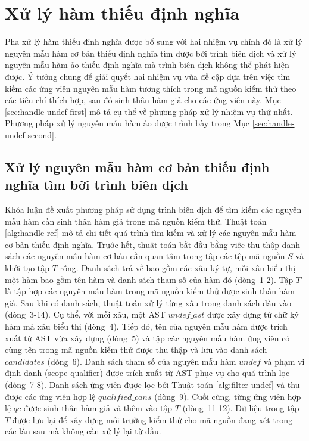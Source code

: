 \section{Xử lý hàm thiếu định nghĩa} \label{sec:handle-undef}
Pha xử lý hàm thiếu định nghĩa được bổ sung với hai nhiệm vụ chính đó là xử lý nguyên mẫu hàm cơ bản thiếu định nghĩa tìm được bởi trình biên dịch và xử lý nguyên mẫu hàm ảo thiếu định nghĩa mà trình biên dịch không thể phát hiện được. Ý tưởng chung để giải quyết hai nhiệm vụ vừa đề cập dựa trên việc tìm kiếm các ứng viên nguyên mẫu hàm tương thích trong mã nguồn kiểm thử theo các tiêu chí thích hợp, sau đó sinh thân hàm giả cho các ứng viên này. Mục \autoref{sec:handle-undef-first} mô tả cụ thể về phương pháp xử lý nhiệm vụ thứ nhất. Phương pháp xử lý nguyên mẫu hàm ảo được trình bày trong Mục \autoref{sec:handle-undef-second}.

\subsection{Xử lý nguyên mẫu hàm cơ bản thiếu định nghĩa tìm bởi trình biên dịch} \label{sec:handle-undef-first}
Khóa luận đề xuất phương pháp sử dụng trình biên dịch để tìm kiếm các nguyên mẫu hàm cần sinh thân hàm giả trong mã nguồn kiểm thử. Thuật toán \autoref{alg:handle-ref} mô tả chi tiết quá trình tìm kiếm và xử lý các nguyên mẫu hàm cơ bản thiếu định nghĩa. Trước hết, thuật toán bắt đầu bằng việc thu thập danh sách các nguyên mẫu hàm cơ bản cần quan tâm trong tập các tệp mã nguồn $S$ và khởi tạo tập $T$ rỗng. Danh sách trả về bao gồm các xâu ký tự, mỗi xâu biểu thị một hàm bao gồm tên hàm và danh sách tham số của hàm đó (dòng~1-2). Tập $T$ là tập hợp các nguyên mẫu hàm trong mã nguồn kiểm thử được sinh thân hàm giả. Sau khi có danh sách, thuật toán xử lý từng xâu trong danh sách đầu vào (dòng~3-14). Cụ thể, với mỗi xâu, một AST $undef\_ast$ được xây dựng từ chữ ký hàm mà xâu biểu thị (dòng~4). Tiếp đó, tên của nguyên mẫu hàm được trích xuất từ AST vừa xây dựng (dòng~5) và tập các nguyên mẫu hàm ứng viên có cùng tên trong mã nguồn kiểm thử được thu thập và lưu vào danh sách $candidates$ (dòng~6). Danh sách tham số của nguyên mẫu hàm $undef$ và phạm vi định danh (scope qualifier) được trích xuất từ AST phục vụ cho quá trình lọc (dòng~7-8). Danh sách ứng viên được lọc bởi Thuật toán \autoref{alg:filter-undef} và thu được các ứng viên hợp lệ $qualified\_cans$ (dòng~9). Cuối cùng, từng ứng viên hợp lệ $qc$ được sinh thân hàm giả và thêm vào tập $T$ (dòng~11-12). Dữ liệu trong tập $T$ được lưu lại để xây dựng môi trường kiểm thử cho mã nguồn đang xét trong các lần sau mà không cần xử lý lại từ đầu.

